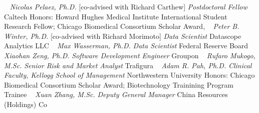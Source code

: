     \newline
~
\Gap{}
\textit{Nicolas Pelaez, Ph.D.}
    [co-advised with Richard Carthew]
\newline
    \textit{Postdoctoral Fellow}
    \newline
    Caltech
    \newline
    {\footnotesize Honors: Howard Hughes Medical Institute International Student Research Fellow; Chicago Biomedical Consortium Scholar Award, }
    \newline
~
\Gap{}
\textit{Peter B. Winter, Ph.D.}
    [co-advised with Richard Morimoto]
\newline
    \textit{Data Scientist}
    \newline
    Datascope Analytics LLC
    \newline
~
\Gap{}
\textit{Max Wasserman, Ph.D.}
\newline
    \textit{Data Scientist}
    \newline
    Federal Reserve Board
    \newline
~
\Gap{}
\textit{Xiaohan Zeng, Ph.D.}
\newline
    \textit{Software Development Engineer}
    \newline
    Groupon
    \newline
~
\Gap{}
\textit{Rufaro Mukogo, M.Sc.}
\newline
    \textit{Senior Risk and Market Analyst}
    \newline
    Trafigura
    \newline
~
\Gap{}
\textit{Adam R. Pah, Ph.D.}
\newline
    \textit{Clinical Faculty, Kellogg School of Management}
    \newline
    Northwestern University
    \newline
    {\footnotesize Honors: Chicago Biomedical Consortium Scholar Award; Biotechnology Trainining Program Trainee}
    \newline
~
\Gap{}
\textit{Xuan Zhang, M.Sc.}
\newline
    \textit{Deputy General Manager}
    \newline
    China Resources (Holdings) Co
    \newline
~
\Gap{}
